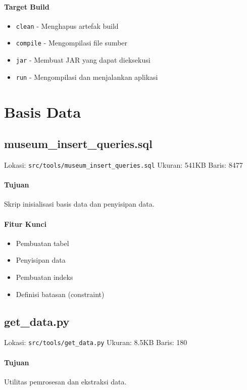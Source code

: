 \documentclass[12pt,a4paper]{article}
\begin{document}
\paragraph{Target Build}
\begin{itemize}
    \item \texttt{clean} - Menghapus artefak build
    \item \texttt{compile} - Mengompilasi file sumber
    \item \texttt{jar} - Membuat JAR yang dapat dieksekusi
    \item \texttt{run} - Mengompilasi dan menjalankan aplikasi
\end{itemize}

\section{Basis Data}
\subsection{museum\_insert\_queries.sql}
Lokasi: \texttt{src/tools/museum\_insert\_queries.sql}
Ukuran: 541KB
Baris: 8477

\paragraph{Tujuan}
Skrip inisialisasi basis data dan penyisipan data.

\paragraph{Fitur Kunci}
\begin{itemize}
    \item Pembuatan tabel
    \item Penyisipan data
    \item Pembuatan indeks
    \item Definisi batasan (constraint)
\end{itemize}

\subsection{get\_data.py}
Lokasi: \texttt{src/tools/get\_data.py}
Ukuran: 8.5KB
Baris: 180

\paragraph{Tujuan}
Utilitas pemrosesan dan ekstraksi data.
\end{document}
